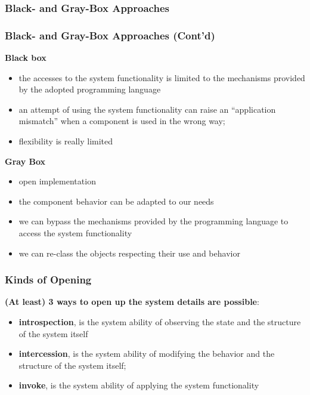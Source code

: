 \subsubsection{Black- and Gray-Box Approaches}

\begin{center}
\end{center}

\subsubsection{Black- and Gray-Box Approaches (Cont'd)}

\textbf{Black box}
\begin{itemize}
	\item the accesses to the system functionality is limited to the mechanisms provided by the adopted programming language
	\item an attempt of using the system functionality can raise an “application mismatch” when a component is used in the wrong way;
	\item flexibility is really limited
\end{itemize}

\textbf{Gray Box}
\begin{itemize}
	\item open implementation
	\item the component behavior can be adapted to our needs
	\item we can bypass the mechanisms provided by the programming language to access the system functionality
	\item we can re-class the objects respecting their use and behavior
\end{itemize}

\subsubsection{Kinds of Opening}

\textbf{(At least) 3 ways to open up the system details are possible}:

\begin{itemize}
	\item \textbf{introspection}, is the system ability of observing the state and the structure of the system itself
	\item \textbf{intercession}, is the system ability of modifying the behavior and the structure of the system itself;
	\item \textbf{invoke}, is the system ability of applying the system functionality
	
\end{itemize}

